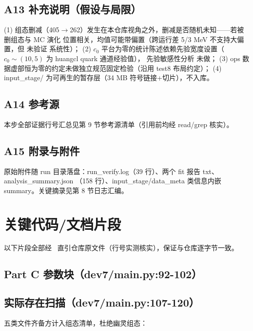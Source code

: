 \documentclass[UTF8]{ctexart}
\begin{document}
\subsection{A13 补充说明（假设与局限）}
\begin{warnbox}
(1) 组态删减（405$\to$262）发生在本仓库视角之外，删减是否随机未知——若被删组态与 MC 演化
位置相关，均值可能带偏置（跨运行差 5/3 MeV 不支持大偏置，但 \textcolor{warn}{未验证} 系统性）；
(2) $c_0$ 平台为零的统计陈述依赖先验宽度设置（$c_0\sim(10,5)$ 为 huangcl quark 通道经验值），
先验敏感性分析 \textcolor{warn}{未做}；
(3) ops 数据虚部恒为零的约定未做独立规范固定检验（沿用 test8 布局约定）；
(4) input\_stage/ 为可再生的暂存层（34 MB 符号链接+切片），不入库。
\end{warnbox}

\subsection{A14 参考源}
本步全部证据行号汇总见第 9 节参考源清单（引用前均经 read/grep 核实）。

\subsection{A15 附录与附件}
原始附件随 run 目录落盘：run\_verify.log（39 行）、两个 fit 报告 txt、analysis\_summary.json
（158 行）、input\_stage/data\_meta 类信息内嵌 summary。关键摘录见第 8 节日志汇编。

\section{关键代码/文档片段}
以下片段全部经 \ 直引仓库原文件（行号实测核实），保证与仓库逐字节一致。

\subsection{Part C 参数块（dev7/main.py:92-102）}


\subsection{实际存在扫描（dev7/main.py:107-120）}
五类文件齐备方计入组态清单，杜绝幽灵组态：

\end{document}
